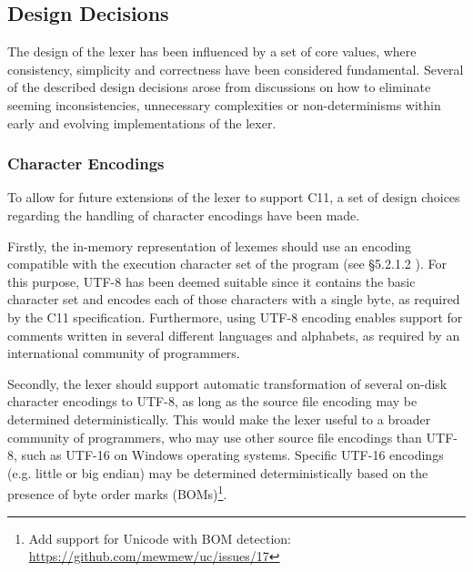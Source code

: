 \subsection{Design Decisions}

The design of the lexer has been influenced by a set of core values, where consistency, simplicity and correctness have been considered fundamental. Several of the described design decisions arose from discussions on how to eliminate seeming inconsistencies, unnecessary complexities or non-determinisms within early and evolving implementations of the lexer.




\subsubsection{Character Encodings}

To allow for future extensions of the lexer to support C11, a set of design choices regarding the handling of character encodings have been made.

Firstly, the in-memory representation of lexemes should use an encoding compatible with the execution character set of the program (see §5.2.1.2 \cite{c11_spec}). For this purpose, UTF-8 has been deemed suitable since it contains the basic character set and encodes each of those characters with a single byte, as required by the C11 specification. Furthermore, using UTF-8 encoding enables support for comments written in several different languages and alphabets, as required by an international community of programmers.

Secondly, the lexer should support automatic transformation of several on-disk character encodings to UTF-8, as long as the source file encoding may be determined deterministically. This would make the lexer useful to a broader community of programmers, who may use other source file encodings than UTF-8, such as UTF-16 on Windows operating systems. Specific UTF-16 encodings (e.g. little or big endian) may be determined deterministically based on the presence of byte order marks (BOMs)\footnote{Add support for Unicode with BOM detection: \url{https://github.com/mewmew/uc/issues/17}}.

